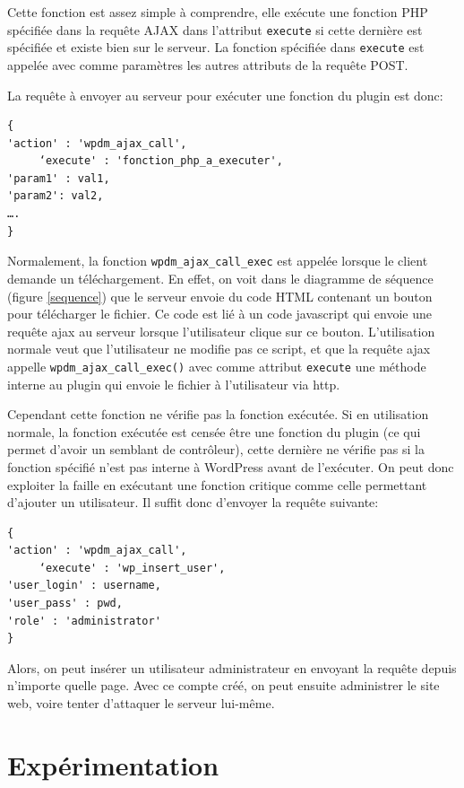 \documentclass[a4paper,oneside,10pt]{article}
\begin{document}
Cette fonction est assez simple à comprendre, elle exécute une fonction PHP spécifiée dans la requête AJAX dans l’attribut \texttt{execute} si cette dernière est spécifiée et existe bien sur le serveur. La fonction spécifiée dans \texttt{execute} est appelée avec comme paramètres les autres attributs de la requête POST.

La requête à envoyer au serveur pour exécuter une fonction du plugin est donc:
\vspace{4em}

\begin{verbatim}
{
'action' : 'wpdm_ajax_call',
     ‘execute' : 'fonction_php_a_executer',
'param1' : val1,
'param2': val2,
….
}
\end{verbatim}

Normalement,  la fonction \texttt{wpdm\_ajax\_call\_exec} est appelée lorsque le client demande un téléchargement. En effet, on voit dans le diagramme de séquence (figure \ref{sequence}) que le serveur envoie du code HTML contenant un bouton pour télécharger le fichier. Ce code est lié à un code javascript qui envoie une requête ajax au serveur lorsque l’utilisateur clique sur ce bouton. L’utilisation normale veut que l’utilisateur ne modifie pas ce script, et que la requête ajax appelle \texttt{wpdm\_ajax\_call\_exec()} avec comme attribut \texttt{execute} une méthode interne au plugin qui envoie le fichier à l’utilisateur via http.

Cependant cette fonction ne vérifie pas la fonction exécutée. Si en utilisation normale, la fonction exécutée est censée être une fonction du plugin (ce qui permet d’avoir un semblant de contrôleur), cette dernière ne vérifie pas si la fonction spécifié n’est pas interne à WordPress avant de l’exécuter. On peut donc exploiter la faille en exécutant une fonction critique comme celle permettant d’ajouter un utilisateur. Il suffit donc d’envoyer la requête suivante:


\begin{verbatim}
{
'action' : 'wpdm_ajax_call',
     ‘execute' : 'wp_insert_user',
'user_login' : username,
'user_pass' : pwd,
'role' : 'administrator'
}
\end{verbatim}

Alors, on peut insérer un utilisateur administrateur en envoyant la requête depuis n’importe quelle page. Avec ce compte créé, on peut ensuite administrer le site web, voire tenter d'attaquer le serveur lui-même.

\section{Expérimentation}
\end{document}
